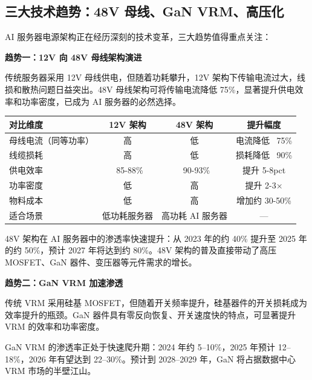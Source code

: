 \subsection{三大技术趋势：48V 母线、GaN VRM、高压化}

AI 服务器电源架构正在经历深刻的技术变革，三大趋势值得重点关注：

\vspace{0.3em}

\textbf{趋势一：12V 向 48V 母线架构演进}

传统服务器采用 12V 母线供电，但随着功耗攀升，12V 架构下传输电流过大，线损和散热问题日益突出。48V 母线架构可将传输电流降低 75\%，显著提升供电效率和功率密度，已成为 AI 服务器的必然选择。

\begin{exhibitbox}[表 3-2：12V vs 48V 母线架构对比]
\centering
\small
\begin{tabularx}{\textwidth}{X c c c}
\toprule
\textbf{对比维度} & \textbf{12V 架构} & \textbf{48V 架构} & \textbf{提升幅度} \\
\midrule
母线电流（同等功率） & 高 & 低 & 电流降低 ~75\% \\
线缆损耗 & 高 & 低 & 损耗降低 ~90\% \\
供电效率 & ~85-88\% & ~90-93\% & 提升 5-8pct \\
功率密度 & 低 & 高 & 提升 2-3× \\
物料成本 & 低 & 高 & 增加约 30-50\% \\
适合场景 & 低功耗服务器 & 高功耗 AI 服务器 & — \\
\bottomrule
\end{tabularx}
\end{exhibitbox}

48V 架构在 AI 服务器中的渗透率快速提升：从 2023 年的约 40\% 提升至 2025 年的约 50\%，预计 2027 年将达到约 80\%。48V 架构的普及直接带动了高压 MOSFET、GaN 器件、变压器等元件需求的增长。

\vspace{0.3em}

\textbf{趋势二：GaN VRM 加速渗透}

传统 VRM 采用硅基 MOSFET，但随着开关频率提升，硅基器件的开关损耗成为效率提升的瓶颈。GaN 器件具有零反向恢复、开关速度快的特点，可显著提升 VRM 的效率和功率密度。

GaN VRM 的渗透率正处于快速爬升期：2024 年约 5–10\%，2025 年预计 12–18\%，2026 年有望达到 22–30\%。预计到 2028–2029 年，GaN 将占据数据中心 VRM 市场的半壁江山。

\vspace{0.3em}

